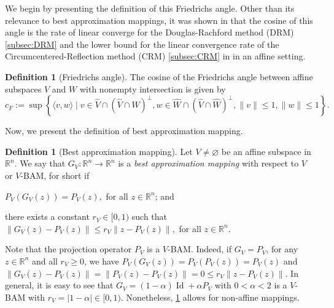 \documentclass[smallextended,numbook,nospthms]{svjour3}
\theoremstyle{plain}
\theoremstyle{definition}
\newtheorem{definition}[theorem]{Definition}
\def\RR{\mathds R}
\DeclareMathOperator{\Id}{Id}
\begin{document}
We begin by presenting the definition of this Friedrichs angle. Other than its relevance to best approximation mappings, it was shown in \cite{BCNPW14} that the cosine of this angle is the rate of linear converge for the Douglas-Rachford method (DRM) \cref{subsec:DRM} and the lower bound for the linear convergence rate of the Circumcentered-Reflection method (CRM) \cref{subsec:CRM} in \cite{Behling:2018} in an affine setting.
\begin{definition}[Friedrichs angle]\label{def:Friedrich}
	The cosine of the Friedrichs angle between affine subspaces $V$ and $W$ with nonempty intersection is given by
	$$
	c_{F}:=\sup \left\{\langle v, w\rangle \mid v \in \hat{V} \cap(\hat{V} \cap \hat{W})^{\perp}, w \in \hat{W} \cap(\hat{V} \cap \hat{W})^{\perp},\|v\| \leq 1,\|w\| \leq 1\right\}.
	$$
\end{definition}

Now, we present the definition of best approximation mapping.
\begin{definition}[Best approximation mapping]\label{def:BAM}
Let $V \neq \varnothing$ be an affine subspace in $\RR^{n}$. We say that $G_{V}: \RR^{n} \rightarrow \RR^{n}$ is a \emph{best approximation mapping} with respect to $V$ or $V$-BAM, for short if
\begin{listi}
	\item $P_{V}\left(G_{V}(z)\right)=P_{V}(z),$ for all $z \in \RR^{n}$; and
	\item there exists a constant $r_{V} \in[0,1)$ such that $\left\|G_{V}(z)-P_{V}(z)\right\| \leq r_{V}\left\|z-P_{V}(z)\right\|,$ for all $z \in \RR^{n}$.
\end{listi}
\end{definition}

Note that the projection operator $P_{V}$ is a $V$-BAM. Indeed, if $G_{V}=P_{V}$, for any $z \in \RR^{n}$ and all $r_{V} \geq 0$, we have $P_{V}\left(G_{V}(z)\right)=P_{V}\left(P_{V}(z)\right)=P_{V}(z)$ and $\left\|G_{V}(z)-P_{V}(z)\right\|=\left\|P_{V}(z)-P_{V}(z)\right\|=0 \leq r_{V}\left\|z-P_{V}(z)\right\|$. 
In general, it is easy to see that $G_{V} = (1-\alpha) \Id + \alpha P_{V}$ with $0<\alpha<2$ is a $V$-BAM with $r_{V}=|1-\alpha| \in[0,1)$. Nonetheless, \cref{def:BAM} allows for non-affine mappings.
\end{document}
